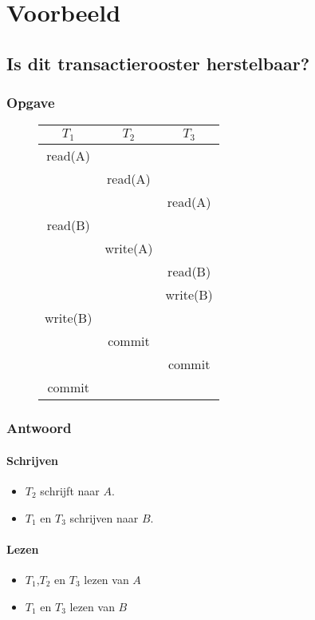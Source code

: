 \documentclass[transacties.tex]{subfiles}
\begin{document}
\chapter{Voorbeeld}

\section{Is dit transactierooster herstelbaar?}
\subsection*{Opgave}
\begin{figure}[H]
\centering
\begin{tabular}{c|c|c}
$T_1$ & $T_2$ & $T_3$\\
\hline
read(A) &&\\
&read(A)&\\
&&read(A)\\
read(B)&&\\
&write(A)&\\
&&read(B)\\
&&write(B)\\
write(B)&&\\
&commit&\\
&&commit\\
commit&&\\
\end{tabular}
\end{figure}


\subsection*{Antwoord}
\subsubsection*{Schrijven}
\begin{itemize}
\item $T_2$ schrijft naar $A$.
\item $T_1$ en $T_3$ schrijven naar $B$.
\end{itemize}
\subsubsection*{Lezen}
\begin{itemize}
\item $T_1$,$T_2$ en $T_3$ lezen van $A$ 
\item $T_1$ en $T_3$ lezen van $B$
\end{itemize}
\end{document}
